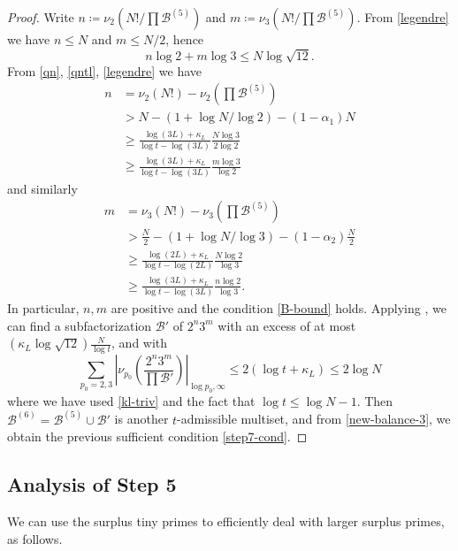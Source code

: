 \documentclass[12pt,a4paper,reqno]{amsart}
\numberwithin{equation}{section}
\theoremstyle{plain}
\theoremstyle{definition}
\newcommand\tuple{{\mathcal B}}
\begin{document}
\begin{proof} Write $n \coloneqq \nu_2(N!/\prod \tuple^{(5)})$ and $m \coloneqq \nu_3(N!/\prod \tuple^{(5)})$.  From \eqref{legendre} we have $n \leq N$ and $m \leq N/2$, hence
$$ n \log 2 + m \log 3 \leq N \log \sqrt{12}.$$
  From \eqref{qn}, \eqref{qntl}, \eqref{legendre} we have
\begin{align*}
  n &= \nu_2(N!) - \nu_2\left(\prod \tuple^{(5)}\right) \\
  &> N - (1+\log N/\log 2) - (1-\alpha_1) N \\
  &\geq \frac{\log(3L) + \kappa_L}{\log t - \log(3L)} \frac{N \log 3}{2\log 2} \\
  &\geq \frac{\log(3L) + \kappa_L}{\log t - \log(3L)} \frac{m \log 3}{\log 2}  
\end{align*}  
and similarly
\begin{align*}
  m &= \nu_3(N!) - \nu_3\left(\prod \tuple^{(5)}\right) \\
  &> \frac{N}{2} - (1+\log N/\log 3) - (1-\alpha_2) \frac{N}{2} \\
  &\geq \frac{\log(2L) + \kappa_L}{\log t - \log(2L)} \frac{N \log 2}{\log 3} \\
  &\geq \frac{\log(3L) + \kappa_L}{\log t - \log(3L)} \frac{n \log 2}{\log 3}.  
\end{align*}  
In particular, $n,m$ are positive and the condition \eqref{B-bound} holds.  Applying , we can find a subfactorization $\tuple'$ of $2^n 3^m$ with an excess of at most $(\kappa_L \log \sqrt{12}) \frac{N}{\log t}$, and with
  $$ \sum_{p_0=2,3} \left|\nu_{p_0}\left(\frac{2^n 3^m}{\prod \tuple'}\right)\right|_{\log p_0,\infty}
   \leq 2(\log t + \kappa_L) \leq 2 \log N$$
   where we have used \eqref{kl-triv} and the fact that $\log t\leq \log N-1$.    Then $\tuple^{(6)} = \tuple^{(5)} \cup \tuple'$ is another $t$-admissible multiset, and from \eqref{new-balance-3}, we obtain the previous sufficient condition  \eqref{step7-cond}.
  \end{proof}
  
\subsection{Analysis of Step 5}

We can use the surplus tiny primes to efficiently deal with larger surplus primes, as follows.
\end{document}
